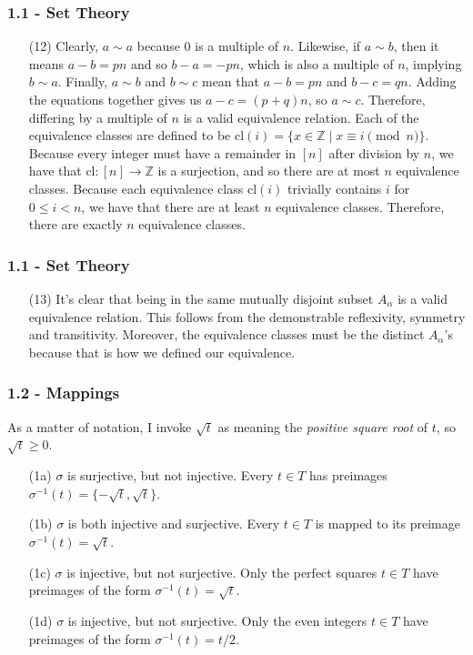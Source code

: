 \documentclass{beamer}
\begin{document}
\begin{frame}
\frametitle{1.1 - Set Theory}
\small
\begin{enumerate}
	\item[(12)] Clearly, $a\sim a$ because $0$ is a multiple of $n$. Likewise, if $a\sim b$, then it means $a - b = pn$ and so $b - a = -pn$, which is also a multiple of $n$, implying $b \sim a$. Finally, $a\sim b$ and $b\sim c$ mean that $a - b = pn$ and $b - c = qn$. Adding the equations together gives us $a - c = (p + q)n$, so $a\sim c$. Therefore, differing by a multiple of $n$ is a valid equivalence relation. Each of the equivalence classes are defined to be $\text{cl}(i) = \{x\in \mathbb Z \mid x\equiv i\pmod{n}\}$. Because every integer must have a remainder in $[n]$ after division by $n$, we have that $\text{cl}: [n] \to \mathbb Z$ is a surjection, and so there are at most $n$ equivalence classes. Because each equivalence class $\text{cl}(i)$ trivially contains $i$ for $0\leq i < n$, we have that there are at least $n$ equivalence classes. Therefore, there are exactly $n$ equivalence classes.
\end{enumerate}
\end{frame}
\begin{frame}
\frametitle{1.1 - Set Theory}
\small
\begin{enumerate}
	\item[(13)] It's clear that being in the same mutually disjoint subset $A_\alpha$ is a valid equivalence relation. This follows from the demonstrable reflexivity, symmetry and transitivity. Moreover, the equivalence classes must be the distinct $A_\alpha$'s because that is how we defined our equivalence.
\end{enumerate}
\end{frame}
\begin{frame}
\frametitle{1.2 - Mappings}
\small
As a matter of notation, I invoke $\sqrt{t}$ as meaning the \textit{positive square root} of $t$, so $\sqrt{t} \geq 0$.
\begin{enumerate}
	\item[(1a)] $\sigma$ is surjective, but not injective. Every $t\in T$ has preimages $\sigma^{-1}(t) = \{-\sqrt{t}, \sqrt{t}\}$.
	\item[(1b)] $\sigma$ is both injective and surjective. Every $t\in T$ is mapped to its preimage $\sigma^{-1}(t) = \sqrt{t}$.
	\item[(1c)] $\sigma$ is injective, but not surjective. Only the perfect squares $t\in T$ have preimages of the form $\sigma^{-1}(t) = \sqrt{t}$.
	\item[(1d)] $\sigma$ is injective, but not surjective. Only the even integers $t\in T$ have preimages of the form $\sigma^{-1}(t) = t/2$.
\end{enumerate}
\end{frame}
\end{document}

